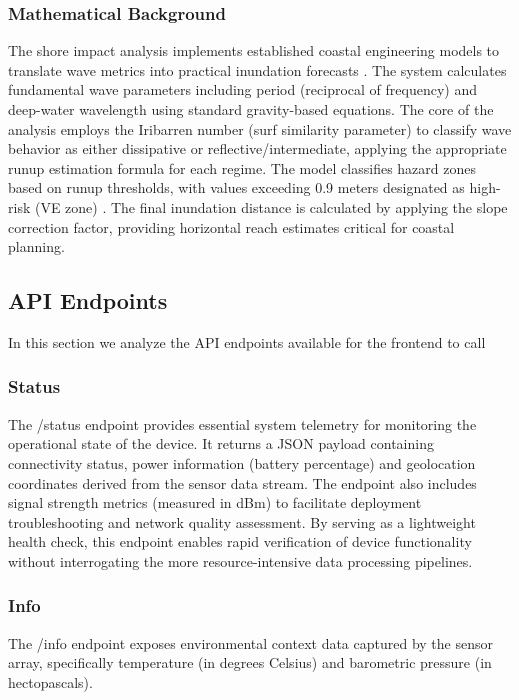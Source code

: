 \documentclass{article}
\begin{document}
    \subsubsection{Mathematical Background}
    The shore impact analysis implements established coastal engineering models to translate wave metrics into practical inundation forecasts \cite{stockdon2006}. The system calculates fundamental wave parameters including period (reciprocal of frequency) and deep-water wavelength using standard gravity-based equations. The core of the analysis employs the Iribarren number (surf similarity parameter) to classify wave behavior as either dissipative or reflective/intermediate, applying the appropriate runup estimation formula for each regime. The model classifies hazard zones based on runup thresholds, with values exceeding 0.9 meters designated as high-risk (VE zone) \cite{fema2022}. The final inundation distance is calculated by applying the slope correction factor, providing horizontal reach estimates critical for coastal planning.

\subsection{API Endpoints}
In this section we analyze the API endpoints available for the frontend to call

    \subsubsection{Status}
    The /status endpoint provides essential system telemetry for monitoring the operational state of the device. It returns a JSON payload containing connectivity status, power information (battery percentage) and geolocation coordinates derived from the sensor data stream. The endpoint also includes signal strength metrics (measured in dBm) to facilitate deployment troubleshooting and network quality assessment. By serving as a lightweight health check, this endpoint enables rapid verification of device functionality without interrogating the more resource-intensive data processing pipelines.

    \subsubsection{Info}
    The /info endpoint exposes environmental context data captured by the sensor array, specifically temperature (in degrees Celsius) and barometric pressure (in hectopascals).
\end{document}
